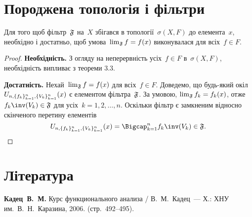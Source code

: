 \section{Породжена топологія і фільтри}

\begin{theorem}
    Для того щоб фільтр~$\frak F$ на~$X$ збігався в топології~$\sigma(X, F)$ до елемента~$x$, необхідно і достатньо, щоб умова~$\lim_{\frak F} f = f(x)$ виконувалася для всіх~$f \in F$.
\end{theorem}
\begin{proof}
    \textbf{Необхідність.} З огляду на неперервність усіх~$f \in F$ в~$\sigma(X, F)$, необхідність випливає з теореми 3.3.

    \textbf{Достатність.} Нехай~$\lim_{\frak F} f = f(x)$ для всіх~$f \in F$. Доведемо, що будь-який окіл~$U_{n,\{f_k\}_{k=1}^n,\{V_k\}_{k=1}^n}(x)$ є елементом фільтра~$\frak F$. За умовою, $\lim_{\frak F} f_k = f_k(x)$, отже~$f_k\inv(V_k) \in \frak F$ для усіх~$k = 1, 2, \dots, n$. Оскільки фільтр є замкненим відносно скінченого перетину елементів
    \begin{equation*}
        \InducedNeighbourhood{x} = \Bigcap_{k = 1}^n f_k\inv(V_k) \in \frak F. \qedhere
    \end{equation*}
\end{proof}

\section{Література}

\begin{enumerate}[label={[\arabic*]}]
\item \textbf{Кадец~В.~М.}
Курс функционального анализа /
В.~М.~Кадец~---
Х.: ХНУ им.~В.~Н.~Каразина, 2006. (стр.~492--495).
\end{enumerate}
